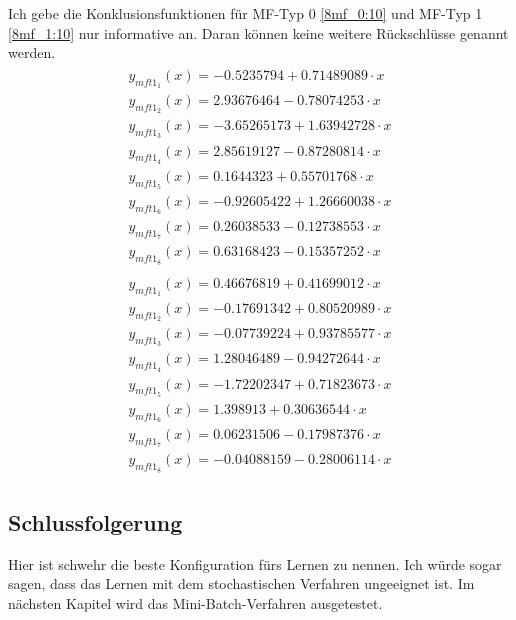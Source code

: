 {Ich gebe die Konklusionsfunktionen für MF-Typ 0 \ref{8mf_0:10} und MF-Typ 1 \ref{8mf_1:10} nur informative an. Daran können keine weitere Rückschlüsse genannt werden. 
\begin{align}
\begin{split}\label{8mf_0:10}
y_{mft1_1}(x) = -0.5235794 + 0.71489089\cdot x \\
y_{mft1_2}(x) = 2.93676464 - 0.78074253\cdot x \\
y_{mft1_3}(x) = -3.65265173 + 1.63942728\cdot x \\
y_{mft1_4}(x) = 2.85619127 - 0.87280814\cdot x \\
y_{mft1_5}(x) = 0.1644323 + 0.55701768\cdot x \\
y_{mft1_6}(x) = -0.92605422 + 1.26660038\cdot x \\
y_{mft1_7}(x) = 0.26038533 - 0.12738553\cdot x \\
y_{mft1_8}(x) = 0.63168423 - 0.15357252\cdot x
\end{split} \\
\begin{split}\label{8mf_1:10}
y_{mft1_1}(x) = 0.46676819 + 0.41699012\cdot x \\
y_{mft1_2}(x) = -0.17691342 + 0.80520989\cdot x \\
y_{mft1_3}(x) = -0.07739224 + 0.93785577\cdot x \\
y_{mft1_4}(x) = 1.28046489 - 0.94272644\cdot x \\
y_{mft1_5}(x) = -1.72202347 + 0.71823673\cdot x \\
y_{mft1_6}(x) = 1.398913 + 0.30636544\cdot x \\
y_{mft1_7}(x) = 0.06231506 - 0.17987376\cdot x \\
y_{mft1_8}(x) = -0.04088159 - 0.28006114\cdot x
\end{split}	
\end{align}

\subsection{Schlussfolgerung}
Hier ist schwehr die beste Konfiguration fürs Lernen zu nennen. Ich würde sogar sagen, dass das Lernen mit dem stochastischen Verfahren ungeeignet ist. Im nächsten Kapitel wird das Mini-Batch-Verfahren ausgetestet.

}
